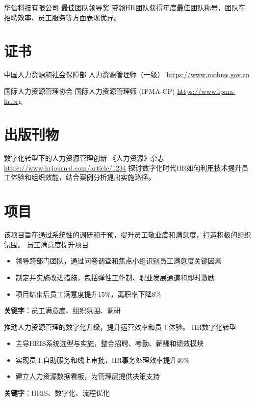 \documentclass[a4paper, serif, 10pt]{moderncv}
\begin{document}
        {华信科技有限公司}
        {最佳团队领导奖}
        {}
        {}
        {带领HR团队获得年度最佳团队称号，团队在招聘效率、员工服务等方面表现优异。}
\section{证书}

        {中国人力资源和社会保障部}
        {人力资源管理师（一级）}
        {\url{https://www.mohrss.gov.cn}}
        {}
        {}

        {国际人力资源管理协会}
        {国际人力资源管理师 (IPMA-CP)}
        {\url{https://www.ipma-hr.org}}
        {}
        {}
\section{出版刊物}

        {数字化转型下的人力资源管理创新}
        {《人力资源》杂志}
        {\url{https://www.hrjournal.com/article/1234}}
        {}
        {探讨数字化时代HR如何利用技术提升员工体验和组织效能，结合案例分析提出实施路径。}
\section{项目}

        {该项目旨在通过系统性的调研和干预，提升员工敬业度和满意度，打造积极的组织氛围。}
        {员工满意度提升项目}
        {}
        {}
        {\begin{itemize}
\item 领导跨部门团队，通过问卷调查和焦点小组识别员工满意度关键因素
\item 制定并实施改进措施，包括弹性工作制、职业发展通道和即时激励
\item 项目结束后员工满意度提升15\%，离职率下降8\%
\end{itemize}
\textbf{关键字}：员工满意度、组织氛围、调研}

        {推动人力资源管理的数字化升级，提升运营效率和员工体验。}
        {HR数字化转型}
        {}
        {}
        {\begin{itemize}
\item 主导HRIS系统选型与实施，整合招聘、考勤、薪酬和绩效模块
\item 实现员工自助服务和线上审批，HR事务处理效率提升40\%
\item 建立人力资源数据看板，为管理层提供决策支持
\end{itemize}
\textbf{关键字}：HRIS、数字化、流程优化}
\end{document}
